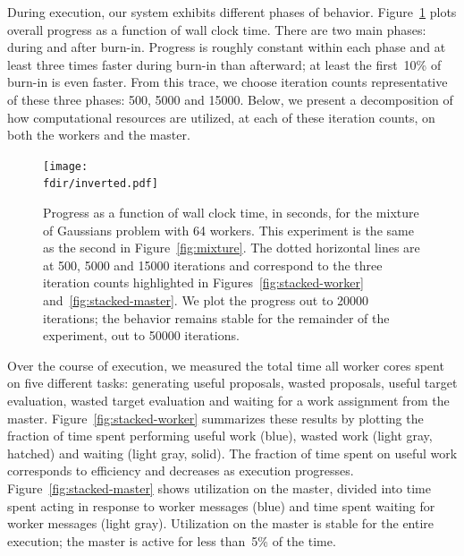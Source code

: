 \documentclass[angelino.tex]{subfiles}
\newcommand{\fdir}{figs/mixture-thesis}
\begin{document}
During execution, our system exhibits different phases of behavior.
Figure~\ref{fig:progress} plots overall progress as a function of wall clock time.
There are two main phases: during and after burn-in.
Progress is roughly constant within each phase
and at least three times faster during burn-in than afterward;
at least the first~10\% of burn-in is even faster.
From this trace, we choose iteration counts representative of these three phases:
500, 5000 and 15000.
Below, we present a decomposition of how computational resources are utilized,
at each of these iteration counts, on both the workers and the master.


\begin{figure}[t!]
\begin{center}
\texttt{[image: \\fdir/inverted.pdf]}
\end{center}
\caption{Progress as a function of wall clock time, in seconds, for the mixture
of Gaussians problem with 64 workers.
This experiment is the same as the second in Figure~\ref{fig:mixture}.
The dotted horizontal lines are at 500, 5000 and 15000 iterations
and correspond to the three iteration counts highlighted in
Figures~\ref{fig:stacked-worker} and~\ref{fig:stacked-master}.
We plot the progress out to 20000 iterations; the behavior remains stable for
the remainder of the experiment, out to 50000 iterations.}
\label{fig:progress}
\end{figure}



Over the course of execution, we measured the total time all worker cores
spent on five different tasks: generating useful proposals, wasted proposals,
useful target evaluation, wasted target evaluation
and waiting for a work assignment from the master.
Figure~\ref{fig:stacked-worker} summarizes these results by plotting the
fraction of time spent performing useful work (blue),
wasted work (light gray, hatched) and waiting (light gray, solid).
The fraction of time spent on useful work corresponds to efficiency
and decreases as execution progresses.
%
Figure~\ref{fig:stacked-master} shows utilization on the master,
divided into time spent acting in response to worker messages (blue)
and  time spent waiting for worker messages (light gray).
Utilization on the master is stable for the entire execution;
the master is active for less than~5\% of the time.
\end{document}
